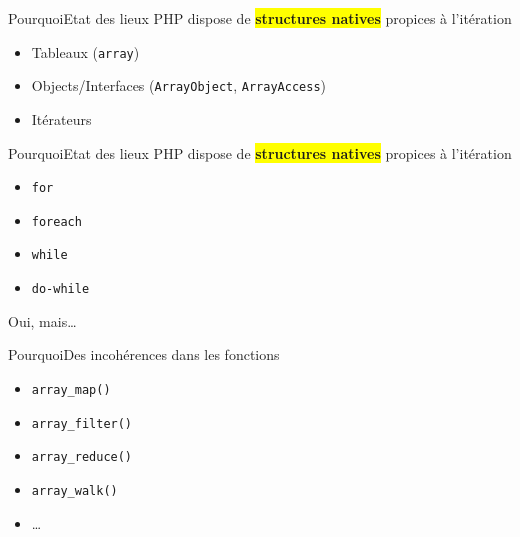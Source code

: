 \begin{frame}{Pourquoi}{Etat des lieux}
    PHP dispose de \colorbox{yellow}{\textbf{structures natives}} propices à l'itération

    \pause

    \begin{itemize}[<+->]
        \item Tableaux (\texttt{array})
        \item Objects/Interfaces (\texttt{ArrayObject}, \texttt{ArrayAccess})
        \item Itérateurs
    \end{itemize}
\end{frame}

\begin{frame}{Pourquoi}{Etat des lieux}
    PHP dispose de \colorbox{yellow}{\textbf{structures natives}} propices à l'itération

    \pause

    \begin{itemize}[<+->]
        \item \texttt{for}
        \item \texttt{foreach}
        \item \texttt{while}
        \item \texttt{do-while}
    \end{itemize}
\end{frame}

\begin{frameC}{Oui, mais\ldots}

\end{frameC}

\begin{frame}{Pourquoi}{Des incohérences dans les fonctions}
    \begin{itemize}
        \item \texttt{array\_map()}
        \item \texttt{array\_filter()}
        \item \texttt{array\_reduce()}
        \item \texttt{array\_walk()}
        \item \ldots
    \end{itemize}
\end{frame}

